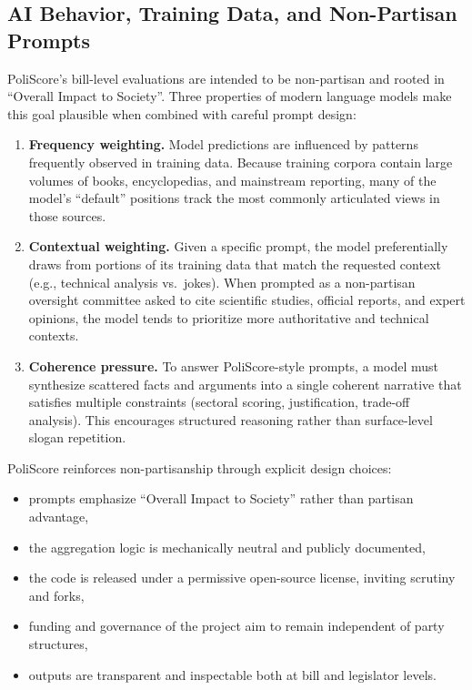 \documentclass[12pt]{article}
\begin{document}
\subsection{AI Behavior, Training Data, and Non-Partisan Prompts}

PoliScore's bill-level evaluations are intended to be non-partisan and rooted in ``Overall Impact to Society''. Three
properties of modern language models make this goal plausible when combined with careful prompt design:

\begin{enumerate}
    \item \textbf{Frequency weighting.} Model predictions are influenced by patterns frequently observed in training data.
    Because training corpora contain large volumes of books, encyclopedias, and mainstream reporting, many of the model's
    ``default'' positions track the most commonly articulated views in those sources.

    \item \textbf{Contextual weighting.} Given a specific prompt, the model preferentially draws from portions of its
    training data that match the requested context (e.g., technical analysis vs.\ jokes). When prompted as a non-partisan
    oversight committee asked to cite scientific studies, official reports, and expert opinions, the model tends to
    prioritize more authoritative and technical contexts.

    \item \textbf{Coherence pressure.} To answer PoliScore-style prompts, a model must synthesize scattered facts and
    arguments into a single coherent narrative that satisfies multiple constraints (sectoral scoring, justification,
    trade-off analysis). This encourages structured reasoning rather than surface-level slogan repetition.
\end{enumerate}

PoliScore reinforces non-partisanship through explicit design choices:

\begin{itemize}
    \item prompts emphasize ``Overall Impact to Society'' rather than partisan advantage,
    \item the aggregation logic is mechanically neutral and publicly documented,
    \item the code is released under a permissive open-source license, inviting scrutiny and forks,
    \item funding and governance of the project aim to remain independent of party structures,
    \item outputs are transparent and inspectable both at bill and legislator levels.
\end{itemize}
\end{document}
